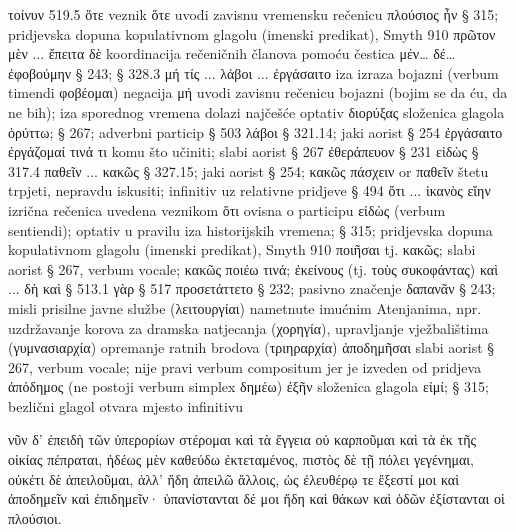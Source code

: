 \begin{description}[noitemsep]
τοίνυν	519.5
ὅτε	veznik ὅτε uvodi zavisnu vremensku rečenicu
πλούσιος ἦν 	§ 315; pridjevska dopuna kopulativnom glagolu (imenski
predikat), Smyth 910
πρῶτον μὲν ... ἔπειτα δὲ	koordinacija rečeničnih članova pomoću čestica μέν… δέ…
ἐφοβούμην	§ 243; § 328.3
μή τίς ... λάβοι ... ἐργάσαιτο	iza izraza bojazni (verbum timendi φοβέομαι) negacija μή uvodi zavisnu rečenicu bojazni (bojim se da ću, da ne bih); iza sporednog vremena dolazi najčešće optativ 
διορύξας	složenica glagola ὀρύττω; § 267; adverbni particip § 503
λάβοι	§ 321.14; jaki aorist § 254
ἐργάσαιτο	ἐργάζομαί τινά τι komu što učiniti; slabi aorist § 267
ἐθεράπευον	§ 231
εἰδὼς	§ 317.4
παθεῖν ... κακῶς 	§ 327.15; jaki aorist § 254; κακῶς πάσχειν or παθεῖν štetu trpjeti, nepravdu iskusiti; infinitiv uz relativne pridjeve § 494
ὅτι ... ἱκανὸς εἴην 
	izrična rečenica uvedena veznikom ὅτι ovisna o participu εἰδὼς (verbum sentiendi); optativ u pravilu iza historijskih vremena; § 315; pridjevska dopuna kopulativnom glagolu (imenski predikat), Smyth 910
ποιῆσαι 	tj. κακῶς;  slabi aorist § 267, verbum vocale; κακῶς ποιέω τινά; ἐκείνους (tj. τοὺς συκοφάντας)
καὶ ... δὴ καὶ	§ 513.1
γὰρ	§ 517
προσετάττετο	§ 232; pasivno značenje
δαπανᾶν	§ 243; misli prisilne javne službe (λειτουργίαι) nametnute imućnim Atenjanima, npr. uzdržavanje korova za dramska natjecanja (χορηγία), upravljanje vježbalištima (γυμνασιαρχία) opremanje ratnih brodova (τριηραρχία)
ἀποδημῆσαι	slabi aorist § 267, verbum vocale; nije pravi verbum compositum jer je izveden od pridjeva ἀπόδημος (ne postoji verbum simplex δημέω)
ἐξῆν	složenica glagola εἰμί; § 315; bezlični glagol otvara mjesto infinitivu
\end{description}


{\large
\begin{greek}
\noindent νῦν δ' 
ἐπειδὴ τῶν ὑπερορίων στέρομαι 
καὶ τὰ ἔγγεια οὐ καρποῦμαι 
καὶ τὰ ἐκ τῆς οἰκίας πέπραται, 
ἡδέως μὲν καθεύδω ἐκτεταμένος, 
πιστὸς δὲ τῇ πόλει γεγένημαι, 
οὐκέτι δὲ ἀπειλοῦμαι, 
ἀλλ' ἤδη ἀπειλῶ ἄλλοις, 
ὡς ἐλευθέρῳ τε ἔξεστί μοι 
καὶ ἀποδημεῖν καὶ ἐπιδημεῖν· 
ὑπανίστανται δέ μοι ἤδη καὶ θάκων 
καὶ ὁδῶν ἐξίστανται οἱ πλούσιοι.

\end{greek}
}

